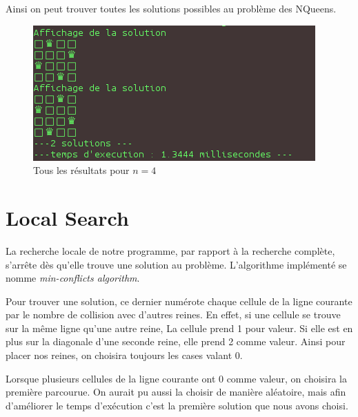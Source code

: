 \documentclass{article}
\begin{document}
Ainsi on peut trouver toutes les solutions possibles au problème des NQueens.
\clearpage

\begin{figure}[!h]
\caption{\label{complete4} Tous les résultats pour $n = 4$}
\begin{center}
\includegraphics[scale=0.5]{./picture/complete_4.png}
\end{center}
\end{figure}

\section{Local Search}

La recherche locale de notre programme, par rapport à la recherche complète, s'arrête dès qu'elle trouve une solution au problème. L'algorithme implémenté se nomme
\emph{min-conflicts algorithm}. 

Pour trouver une solution, ce dernier numérote chaque cellule de la ligne courante par le nombre de collision avec d'autres reines. En effet, si une cellule se trouve sur la même ligne qu'une autre reine, La cellule prend 1 pour valeur. Si elle est en plus sur la diagonale d'une seconde reine, elle prend 2 comme valeur.
Ainsi pour placer nos reines, on choisira toujours les cases valant 0.

Lorsque plusieurs cellules de la ligne courante ont 0 comme valeur, on choisira la première parcourue. On aurait pu aussi la choisir de manière aléatoire, mais afin d'améliorer le temps d'exécution c'est la première solution que nous avons choisi. 
\end{document}
